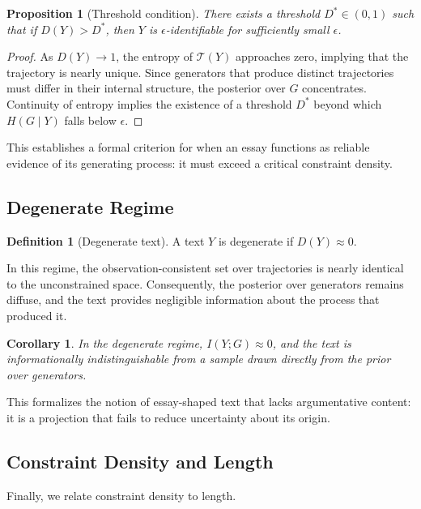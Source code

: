\documentclass[12pt, oneside]{article}
\theoremstyle{plain}
\newtheorem{proposition}[theorem]{Proposition}
\newtheorem{corollary}[theorem]{Corollary}
\theoremstyle{definition}
\newtheorem{definition}[theorem]{Definition}
\theoremstyle{remark}
\begin{document}
\begin{proposition}[Threshold condition]
There exists a threshold $D^* \in (0,1)$ such that if $D(Y) > D^*$, then $Y$
is $\epsilon$-identifiable for sufficiently small $\epsilon$.
\end{proposition}

\begin{proof}
As $D(Y) \to 1$, the entropy of $\mathcal{T}(Y)$ approaches zero, implying that
the trajectory is nearly unique. Since generators that produce distinct trajectories
must differ in their internal structure, the posterior over $G$ concentrates.
Continuity of entropy implies the existence of a threshold $D^*$ beyond which
$H(G \mid Y)$ falls below $\epsilon$.
\end{proof}

This establishes a formal criterion for when an essay functions as reliable
evidence of its generating process: it must exceed a critical constraint density.

\subsection{Degenerate Regime}

\begin{definition}[Degenerate text]
A text $Y$ is degenerate if $D(Y) \approx 0$.
\end{definition}

In this regime, the observation-consistent set over trajectories is nearly identical
to the unconstrained space. Consequently, the posterior over generators remains
diffuse, and the text provides negligible information about the process that
produced it.

\begin{corollary}
In the degenerate regime, $I(Y; G) \approx 0$, and the text is informationally
indistinguishable from a sample drawn directly from the prior over generators.
\end{corollary}

This formalizes the notion of essay-shaped text that lacks argumentative content:
it is a projection that fails to reduce uncertainty about its origin.

\subsection{Constraint Density and Length}

Finally, we relate constraint density to length.
\end{document}
